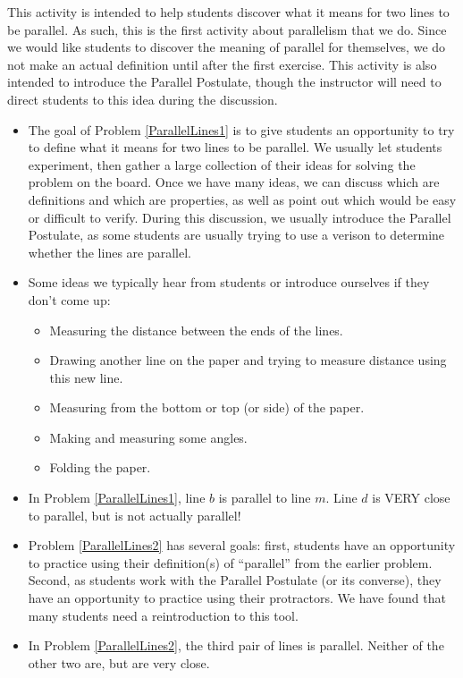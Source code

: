 \documentclass[nooutcomes]{ximera}
\begin{document}
\newpage

\begin{instructorNotes}
This activity is intended to help students discover what it means for two lines to be parallel.  As such, this is the first activity about parallelism that we do.  Since we would like students to discover the meaning of parallel for themselves, we do not make an actual definition until after the first exercise.  This activity is also intended to introduce the Parallel Postulate, though the instructor will need to direct students to this idea during the discussion.  

\begin{itemize}
    \item The goal of Problem \ref{ParallelLines1} is to give students an opportunity to try to define what it means for two lines to be parallel.  We usually let students experiment, then gather a large collection of their ideas for solving the problem on the board.  Once we have many ideas, we can discuss which are definitions and which are properties, as well as point out which would be easy or difficult to verify.  During this discussion, we usually introduce the Parallel Postulate, as some students are usually trying to use a verison to determine whether the lines are parallel.
    \item Some ideas we typically hear from students or introduce ourselves if they don't come up: 
        \begin{itemize}
            \item Measuring the distance between the ends of the lines.
            \item Drawing another line on the paper and trying to measure distance using this new line.
            \item Measuring from the bottom or top (or side) of the paper.
            \item Making and measuring some angles. 
            \item Folding the paper.
        \end{itemize}
    \item In Problem \ref{ParallelLines1}, line $b$ is parallel to line $m$.  Line $d$ is VERY close to parallel, but is not actually parallel!

\item Problem \ref{ParallelLines2} has several goals: first, students have an opportunity to practice using their definition(s) of ``parallel'' from the earlier problem.  Second, as students work with the Parallel Postulate (or its converse), they have an opportunity to practice using their protractors.  We have found that many students need a reintroduction to this tool.
\item In Problem \ref{ParallelLines2}, the third pair of lines is parallel.  Neither of the other two are, but are very close.
\end{itemize}




\end{instructorNotes}
\end{document}
